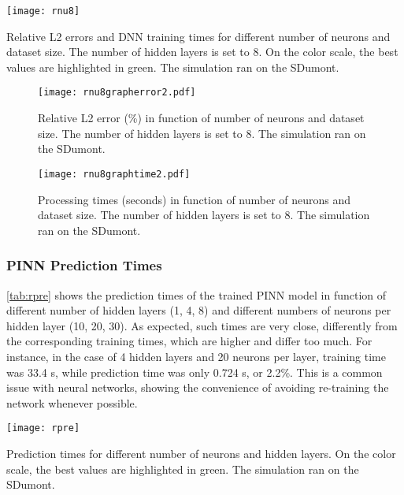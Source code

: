 \begin{table}[htb]\centering
\texttt{[image: rnu8]}
\vspace{1em}
\caption{Relative L2 errors and DNN training times for different number of neurons and dataset size. The number of hidden layers is set to 8. On the color scale, the best values are highlighted in green. The simulation ran on the SDumont.}
\label{tab:rnu8}
\end{table}

\begin{figure}[htb]\centering
\texttt{[image: rnu8grapherror2.pdf]}
\vspace{0em}
\caption{Relative L2 error (\%) in function of number of neurons and dataset size. The number of hidden layers is set to 8. The simulation ran on the SDumont.}
\label{fig:rnu8grapherror2}
\end{figure}

\begin{figure}[htb]\centering
\texttt{[image: rnu8graphtime2.pdf]}
\vspace{-1em}
\caption{Processing times (seconds) in function of number of neurons and dataset size. The number of hidden layers is set to 8. The simulation ran on the SDumont.}
\label{fig:rnu8graphtime2}
\end{figure}

\subsubsection{PINN Prediction Times}

\autoref{tab:rpre} shows the prediction times of the trained PINN model in function of different number of hidden layers (1, 4, 8) and different numbers of neurons per hidden layer (10, 20, 30). As expected, such times are very close, differently from the corresponding training times, which are higher and differ too much. For instance,  in the case of 4 hidden layers and 20 neurons per layer, training time was 33.4 s, while prediction time was only 0.724 s, or 2.2\%. This is a common issue with neural networks, showing the convenience of avoiding re-training the network whenever possible.

\begin{table}[htb]\centering
\texttt{[image: rpre]}
\vspace{1em}
\caption{Prediction times for different number of neurons and hidden layers. On the color scale, the best values are highlighted in green. The simulation ran on the SDumont.}
\label{tab:rpre}
\end{table}






